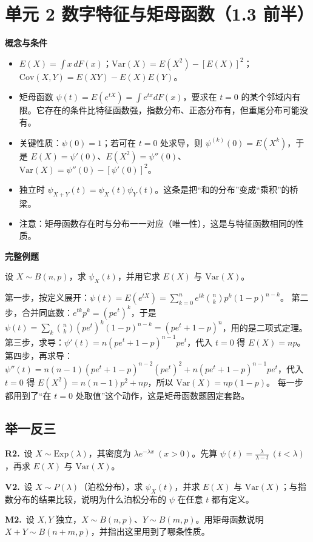 \documentclass[UTF8,a4paper,11pt]{ctexart}
\newcommand{\PracticeQuestion}[3]{\par\Needspace{4\baselineskip}\noindent\begin{minipage}{\linewidth}\textbf{#1.}\ #2\par\noindent\rule{0pt}{#3mm}\par\end{minipage}\par}
\begin{document}
\section{单元 2 数字特征与矩母函数（1.3 前半）}
\textbf{概念与条件}

\begin{itemize}
\item $E(X)=\int x\,dF(x)$；$\mathrm{Var}(X)=E(X^2)-[E(X)]^2$；$\mathrm{Cov}(X,Y)=E(XY)-E(X)E(Y)$。
\item 矩母函数 $\psi(t)=E(e^{tX})=\int e^{tx}dF(x)$，要求在 $t=0$ 的某个邻域内有限。它存在的条件比特征函数强，指数分布、正态分布有，但重尾分布可能没有。
\item 关键性质：$\psi(0)=1$；若可在 $t=0$ 处求导，则 $\psi^{(k)}(0)=E(X^k)$，于是 $E(X)=\psi'(0)$、$E(X^2)=\psi''(0)$、$\mathrm{Var}(X)=\psi''(0)-[\psi'(0)]^2$。
\item 独立时 $\psi_{X+Y}(t)=\psi_X(t)\psi_Y(t)$。这条是把“和的分布”变成“乘积”的桥梁。
\item 注意：矩母函数存在时与分布一一对应（唯一性），这是与特征函数相同的性质。
\end{itemize}
\textbf{完整例题}

设 $X\sim B(n,p)$，求 $\psi_X(t)$，并用它求 $E(X)$ 与 $\mathrm{Var}(X)$。

第一步，按定义展开：$\psi(t)=E(e^{tX})=\sum_{k=0}^{n}e^{tk}\binom{n}{k}p^k(1-p)^{n-k}$。 第二步，合并同底数：$e^{tk}p^k=(pe^{t})^k$，于是 $\psi(t)=\sum_{k}\binom{n}{k}(pe^{t})^k(1-p)^{n-k}=(pe^{t}+1-p)^n$，用的是二项式定理。 第三步，求导：$\psi'(t)=n(pe^{t}+1-p)^{n-1}pe^{t}$，代入 $t=0$ 得 $E(X)=np$。 第四步，再求导：$\psi''(t)=n(n-1)(pe^{t}+1-p)^{n-2}(pe^{t})^2+n(pe^{t}+1-p)^{n-1}pe^{t}$，代入 $t=0$ 得 $E(X^2)=n(n-1)p^2+np$，所以 $\mathrm{Var}(X)=np(1-p)$。 每一步都用到了“在 $t=0$ 处取值”这个动作，这是矩母函数题固定套路。

\subsection{举一反三}
\PracticeQuestion{R2}{设 $X\sim \mathrm{Exp}(\lambda)$，其密度为 $\lambda e^{-\lambda x}\ (x>0)$。先算 $\psi(t)=\frac{\lambda}{\lambda-t}\ (t<\lambda)$，再求 $E(X)$ 与 $\mathrm{Var}(X)$。}{38}
\PracticeQuestion{V2}{设 $X\sim P(\lambda)$（泊松分布），求 $\psi_X(t)$，并求 $E(X)$ 与 $\mathrm{Var}(X)$；与指数分布的结果比较，说明为什么泊松分布的 $\psi$ 在任意 $t$ 都有定义。}{42}
\PracticeQuestion{M2}{设 $X,Y$ 独立，$X\sim B(n,p)$、$Y\sim B(m,p)$。用矩母函数说明 $X+Y\sim B(n+m,p)$，并指出这里用到了哪条性质。}{34}
\clearpage
{}
\end{document}
